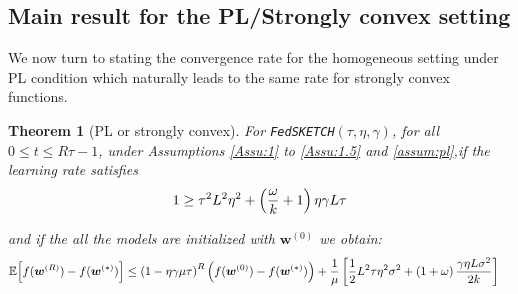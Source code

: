 \documentclass[twoside]{article}
\newtheorem{theorem}{Theorem}
\begin{document}
\subsection{Main result for the PL/Strongly convex setting}
 
We now turn to stating the convergence rate for the homogeneous setting under PL condition which naturally leads to the same rate for strongly convex functions.
\begin{theorem}[PL or strongly convex]\label{thm:pl-iid}
For \texttt{FedSKETCH}$(\tau, \eta, \gamma)$, for all $0\leq t\leq R\tau-1$,  under Assumptions \ref{Assu:1} to \ref{Assu:1.5} and \ref{assum:pl},if the learning rate satisfies 
\begin{align}\notag
   1\geq {\tau^2 L^2\eta^2}+\left(\frac{\omega}{k}+1\right){\eta\gamma L}{\tau} 
\end{align}

and if the all the models are initialized with $\boldsymbol{w}^{(0)}$ we obtain:
\begin{align}\notag
        \mathbb{E}\Big[f({\boldsymbol{w}}^{(R)})-f({\boldsymbol{w}}^{(*)})\Big]&\leq \left(1-\eta\gamma{\mu\tau}\right)^R\left(f(\boldsymbol{w}^{(0)})-f(\boldsymbol{w}^{(*)})\right)+\frac{1}{{\mu}}\left[\frac{1}{2} L^2\tau\eta^2\sigma^2+\left(1+\omega\right)\frac{\gamma\eta L\sigma^2}{2k}\right]
\end{align}
\end{theorem}
\end{document}
